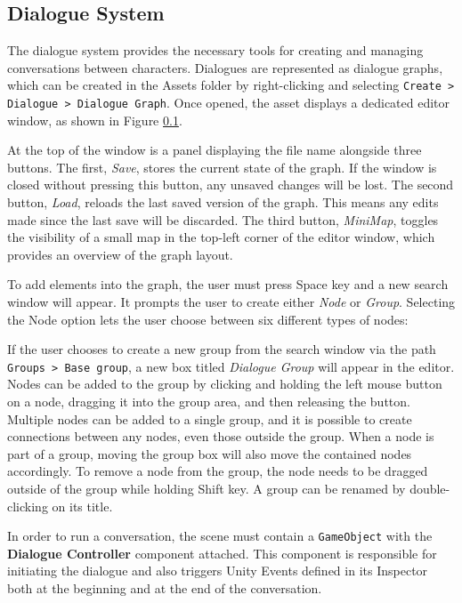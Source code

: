 \subsection{Dialogue System}
The dialogue system provides the necessary tools for creating and managing conversations between characters. Dialogues are represented as dialogue graphs, which can be created in the Assets folder by right-clicking and selecting \verb|Create > Dialogue > Dialogue Graph|. Once opened, the asset displays a dedicated editor window, as shown in Figure \ref{}.

At the top of the window is a panel displaying the file name alongside three buttons. The first, \textit{Save}, stores the current state of the graph. If the window is closed without pressing this button, any unsaved changes will be lost. The second button, \textit{Load}, reloads the last saved version of the graph. This means any edits made since the last save will be discarded. The third button, \textit{MiniMap}, toggles the visibility of a small map in the top-left corner of the editor window, which provides an overview of the graph layout.

To add elements into the graph, the user must press Space key and a new search window will appear. It prompts the user to create either \textit{Node} or \textit{Group}. Selecting the Node option lets the user choose between six different types of nodes:


If the user chooses to create a new group from the search window via the path \verb|Groups > Base group|, a new box titled \textit{Dialogue Group} will appear in the editor. Nodes can be added to the group by clicking and holding the left mouse button on a node, dragging it into the group area, and then releasing the button. Multiple nodes can be added to a single group, and it is possible to create connections between any nodes, even those outside the group. When a node is part of a group, moving the group box will also move the contained nodes accordingly. To remove a node from the group, the node needs to be dragged outside of the group while holding Shift key. A group can be renamed by double-clicking on its title. 

In order to run a conversation, the scene must contain a \verb|GameObject| with the \textbf{Dialogue Controller} component attached. This component is responsible for initiating the dialogue and also triggers Unity Events defined in its Inspector both at the beginning and at the end of the conversation. 


